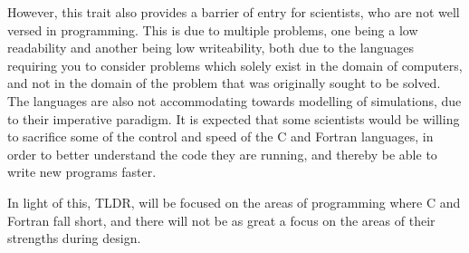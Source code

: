 However, this trait also provides a barrier of entry for scientists, who are not well versed in programming. This is due to multiple problems, one being a low readability and another being low writeability, both due to the languages requiring you to consider problems which solely exist in the domain of computers, and not in the domain of the problem that was originally sought to be solved. The languages are also not accommodating towards modelling of simulations, due to their imperative paradigm. It is expected that some scientists would be willing to sacrifice some of the control and speed of the C and Fortran languages, in order to better understand the code they are running, and thereby be able to write new programs faster.

In light of this, TLDR, will be focused on the areas of programming where C and Fortran fall short, and there will not be as great a focus on the areas of their strengths during design.

